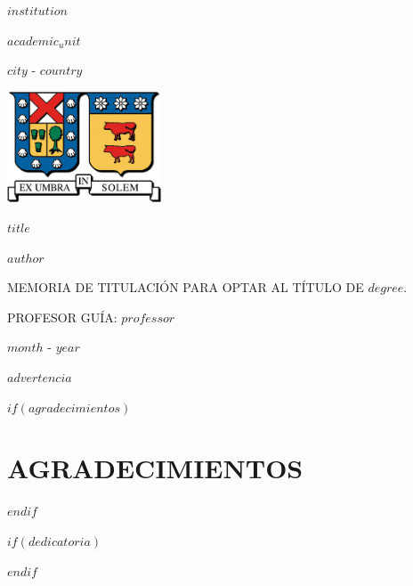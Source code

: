 \documentclass[$if(fontsize)$$fontsize$,$endif$$if(lang)$$lang$,$endif$$if(papersize)$$papersize$,$endif$$for(classoption)$$classoption$$sep$,$endfor$]{$documentclass$}
\begin{document}
    \begin{titlepage}
        \centering
        \bfseries

        \fontsize{18pt}{21.6pt}\selectfont
        \MakeUppercase{$institution$}

        \fontsize{16pt}{19.2pt}\selectfont
        \MakeUppercase{$academic_unit$}

        \fontsize{14pt}{16.8pt}\selectfont
        \MakeUppercase{$city$ - $country$}

        \vspace{1cm}
        \includegraphics[height=33mm]
            {template/Logo_UTFSM_crop.png}

        \vfill

        \fontsize{20pt}{24pt}\selectfont
        \MakeUppercase{$title$}

        \vfill

        \fontsize{14pt}{16.8pt}\selectfont
        \MakeUppercase{$author$}

        \fontsize{12pt}{14.4pt}\selectfont
        \MakeUppercase{
            Memoria de Titulación para optar al título de
            $degree$.
        }

        \fontsize{12pt}{14.4pt}\selectfont
        \MakeUppercase{PROFESOR GUÍA: $professor$}

        \fontsize{14pt}{16.8pt}\selectfont
        \MakeUppercase{$month$ - $year$}
        \par

        \fontsize{14pt}{16.8pt}\selectfont
        $advertencia$
        \par
    \end{titlepage}
    \pagebreak


    $if(agradecimientos)$
        \section*{\centering AGRADECIMIENTOS}
        
        \pagebreak
    $endif$

    $if(dedicatoria)$
        \begin{flushright}
            \itshape
            
        \end{flushright}
        \pagebreak
    $endif$
\end{document}
